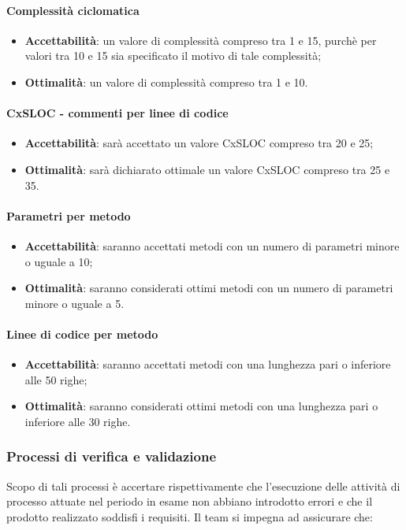 \paragraph{Complessità ciclomatica}
\begin{itemize}
	\item \textbf{Accettabilità}: un valore di complessità compreso tra 1 e 15, purchè per valori tra 10 e 15 sia specificato il motivo di tale complessità;
	\item \textbf{Ottimalità}: un valore di complessità compreso tra 1 e 10.
\end{itemize}

\paragraph{CxSLOC - commenti per linee di codice}
\begin{itemize}
	\item \textbf{Accettabilità}: sarà accettato un valore CxSLOC compreso tra 20 e 25;
	\item \textbf{Ottimalità}: sarà dichiarato ottimale un valore CxSLOC compreso tra 25 e 35.
\end{itemize}

\paragraph{Parametri per metodo}
\begin{itemize}
	\item \textbf{Accettabilità}: saranno accettati metodi con un numero di parametri minore o uguale a 10;
	\item \textbf{Ottimalità}: saranno considerati ottimi metodi con un numero di parametri minore o uguale a 5.
\end{itemize}

\paragraph{Linee di codice per metodo}
\begin{itemize}
	\item \textbf{Accettabilità}: saranno accettati metodi con una lunghezza pari o inferiore alle 50 righe;
	\item \textbf{Ottimalità}: saranno considerati ottimi metodi con una lunghezza pari o inferiore alle 30 righe.
\end{itemize}


\subsubsection{Processi di verifica e validazione}
Scopo di tali processi è accertare rispettivamente che l'esecuzione delle attività di processo attuate nel periodo in esame non abbiano introdotto errori e che il prodotto realizzato soddisfi i requisiti. Il team si impegna ad assicurare che:

